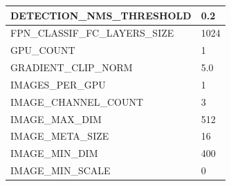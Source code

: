 \begin{longtable}[h]{|l|l|}
	DETECTION\_NMS\_THRESHOLD       & 0.2                                                                                                                                                                                    \\ \hline
	FPN\_CLASSIF\_FC\_LAYERS\_SIZE  & 1024                                                                                                                                                                                   \\ \hline
	GPU\_COUNT                      & 1                                                                                                                                                                                      \\ \hline
	GRADIENT\_CLIP\_NORM            & 5.0                                                                                                                                                                                    \\ \hline
	IMAGES\_PER\_GPU                & 1                                                                                                                                                                                      \\ \hline
	IMAGE\_CHANNEL\_COUNT           & 3                                                                                                                                                                                      \\ \hline
	IMAGE\_MAX\_DIM                 & 512                                                                                                                                                                                    \\ \hline
	IMAGE\_META\_SIZE               & 16                                                                                                                                                                                     \\ \hline
	IMAGE\_MIN\_DIM                 & 400                                                                                                                                                                                    \\ \hline
	IMAGE\_MIN\_SCALE               & 0                                                                                                                                                                                      \\ \hline

\end{longtable}
